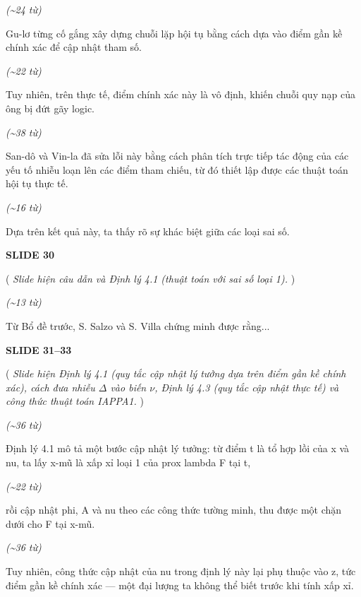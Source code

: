 ﻿\documentclass[12pt]{article}
\newcommand{\scene}[1]{
    \vspace{18pt}
    \normalsize
    \noindent\textbf{\MakeUppercase{#1}}
    \vspace{12pt}
}
\newcommand{\action}[1]{
    \vspace{6pt}
    \small
    \noindent(\textit{#1})
    \vspace{6pt}
}
\newenvironment{speech}{
    \normalsize
    \begin{list}{}{
        \leftmargin=1.25in
        \rightmargin=1.25in
        \parsep=0pt
        \topsep=0pt
        \partopsep=0pt
    }
    \item[]
}{
    \end{list}
    \vspace{6pt}
}
\newcommand{\block}[1]{
    \vspace{4pt}
    \noindent\hspace{1.5in}\textit{(\textasciitilde #1 từ)}
}
\begin{document}
\block{24}
\begin{speech}
    Gu-lơ từng cố gắng xây dựng chuỗi lặp hội tụ bằng cách dựa vào điểm gần kề chính xác để cập nhật tham số.
\end{speech}

\block{22}
\begin{speech}
    Tuy nhiên, trên thực tế, điểm chính xác này là vô định, khiến chuỗi quy nạp của ông bị đứt gãy logic.
\end{speech}

\block{38}
\begin{speech}
    San-dô và Vin-la đã sửa lỗi này bằng cách phân tích trực tiếp tác động của các yếu tố nhiễu loạn lên các điểm tham chiếu, từ đó thiết lập được các thuật toán hội tụ thực tế.
\end{speech}

\block{16}
\begin{speech}
    Dựa trên kết quả này, ta thấy rõ sự khác biệt giữa các loại sai số.
\end{speech}

\scene{SLIDE 30}

\action{
    Slide hiện câu dẫn và Định lý 4.1 (thuật toán với sai số loại 1).
}

\block{13}
\begin{speech}
    Từ Bổ đề trước, S. Salzo và S. Villa chứng minh được rằng...
\end{speech}

\scene{SLIDE 31--33}

\action{
    Slide hiện Định lý 4.1 (quy tắc cập nhật lý tưởng dựa trên điểm gần kề chính xác), cách đưa nhiễu $\Delta$ vào biến $\nu$, Định lý 4.3 (quy tắc cập nhật thực tế) và công thức thuật toán IAPPA1.
}

\block{36}
\begin{speech}
    Định lý 4.1 mô tả một bước cập nhật lý tưởng: từ điểm t là tổ hợp lồi của x và nu, ta lấy x-mũ là xấp xỉ loại 1 của prox lambda F tại t,
\end{speech}

\block{22}
\begin{speech}
    rồi cập nhật phi, A và nu theo các công thức tường minh, thu được một chặn dưới cho F tại x-mũ.
\end{speech}

\block{36}
\begin{speech}
    Tuy nhiên, công thức cập nhật của nu trong định lý này lại phụ thuộc vào z, tức điểm gần kề chính xác — một đại lượng ta không thể biết trước khi tính xấp xỉ.
\end{speech}
\end{document}
